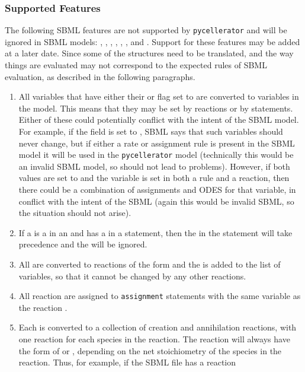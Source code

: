 \subsubsection{Supported Features}

The following SBML features are not supported by {\tt pycellerator} and will be ignored in SBML models: , , , ,  , , and  .  Support for these features may be added at a later date. 
Since some of the structures need to be translated, and the way things are evaluated may not correspond to the expected rules of SBML evaluation, as described in the following paragraphs.


\begin{enumerate}
\item All variables that have either their  or  flag set to  are converted to  variables in the model. This means that they may be set by  reactions or by  statements. Either of these could potentially conflict with the intent of the SBML model. For example, if the  field is set to , SBML says that such variables should never change, but if either a rate or assignment rule is present in the SBML model it will be used in the {\tt pycellerator} model (technically this would be an invalid SBML model, so should  not lead to problems). However, if both values are set to  and the variable is set in both a rule and a reaction, then there could be a combination of assignments and ODES for that variable, in conflict with the intent of the SBML (again this would be invalid SBML, so the situation should not arise). 
\item If a  is a  in an  and has a  in a  statement, then the  in the  statement will take precedence and the  will be ignored. 
\item All  are converted to  reactions of the form  and the  is added to the list of  variables, so that it cannot be changed by any other reactions. 
\item All reaction  are assigned to {\tt assignment} statements with the same variable as the reaction . 
\item Each  is converted to a collection of  creation and annihilation reactions, with one reaction for each species in the reaction. The reaction will always have the form of  or , depending on the net stoichiometry of the species in the reaction. Thus, for example, if the SBML file has a reaction 

\end{enumerate}
